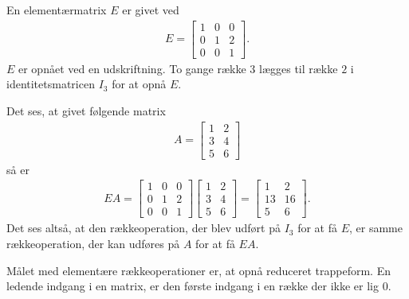 \begin{eks}
En elementærmatrix $E$ er givet ved
\begin{align*}
E =\begin{bmatrix}
1 & 0 & 0 \\
0 & 1 & 2 \\
0 & 0 & 1 
\end{bmatrix}.
\end{align*}
$E$ er opnået ved en udskriftning. To gange række $3$ lægges til række $2$ i identitetsmatricen $I_3$ for at opnå $E$.

Det ses, at givet følgende matrix
\begin{align*}
A =\begin{bmatrix}
1 & 2 \\
3 & 4 \\
5 & 6 
\end{bmatrix}
\end{align*}
så er
\begin{align*}
EA =\begin{bmatrix}
1 & 0 & 0 \\
0 & 1 & 2 \\
0 & 0 & 1
\end{bmatrix}
\begin{bmatrix}
1 & 2 \\
3 & 4 \\
5 & 6
\end{bmatrix}
=\begin{bmatrix}
1 & 2 \\
13 & 16 \\
5 & 6
\end{bmatrix}.
\end{align*}
Det ses altså, at den rækkeoperation, der blev udført på $I_3$ for at få $E$, er samme rækkeoperation, der kan udføres på $A$ for at få $EA$. 
\end{eks}
 


Målet med elementære rækkeoperationer er, at opnå reduceret trappeform. En ledende indgang i en matrix, er den første indgang i en række der ikke er lig 0. 

